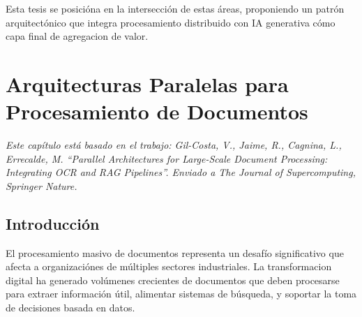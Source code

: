 \documentclass[12pt,a4paper,twoside]{book}
\begin{document}
Esta tesis se posicióna en la intersección de estas áreas, proponiendo un patrón arquitectónico que integra procesamiento distribuido con IA generativa cómo capa final de agregacion de valor.


\chapter{Arquitecturas Paralelas para Procesamiento de Documentos}
\label{cap:documentos}

\begin{center}
\textit{Este capítulo está basado en el trabajo: Gil-Costa, V., Jaime, R., Cagnina, L., Errecalde, M. ``Parallel Architectures for Large-Scale Document Processing: Integrating OCR and RAG Pipelines''. Enviado a The Journal of Supercomputing, Springer Nature.}
\end{center}

\vspace{0.5cm}


\vspace{1cm}

\section{Introducción}

El procesamiento masivo de documentos representa un desafío significativo que afecta a organizaciónes de múltiples sectores industriales. La transformacion digital ha generado volúmenes crecientes de documentos que deben procesarse para extraer información útil, alimentar sistemas de búsqueda, y soportar la toma de decisiones basada en datos.
\end{document}
